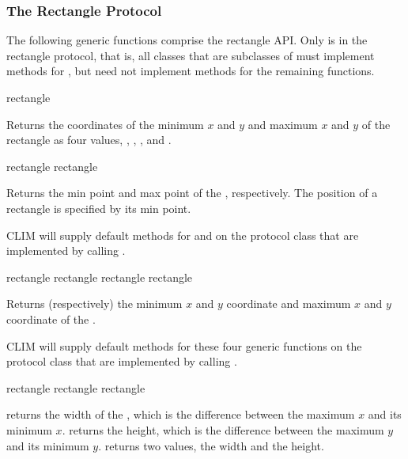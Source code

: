 \MayCaptureInputs


\subsubsection {The Rectangle Protocol}

The following generic functions comprise the rectangle API.  Only
 is in the rectangle protocol, that is, all classes that
are subclasses of  must implement methods for
, but need not implement methods for the remaining
functions.

 {rectangle}

Returns the coordinates of the minimum $x$ and $y$ and maximum $x$ and $y$ of
the rectangle  as four values, , ,
, and .

 {rectangle}
 {rectangle}

Returns the min point and max point of the  ,
respectively.  The position of a rectangle is specified by its min point.

CLIM will supply default methods for  and
 on the protocol class  that are
implemented by calling .


 {rectangle}
 {rectangle}
 {rectangle}
 {rectangle}

Returns (respectively) the minimum $x$ and $y$ coordinate and maximum $x$ and
$y$ coordinate of the  .

CLIM will supply default methods for these four generic functions on the
protocol class  that are implemented by calling
.


  {rectangle}
 {rectangle}
   {rectangle}

 returns the width of the  ,
which is the difference between the maximum $x$ and its minimum $x$.
 returns the height, which is the difference between the
maximum $y$ and its minimum $y$.   returns two values, the
width and the height.

